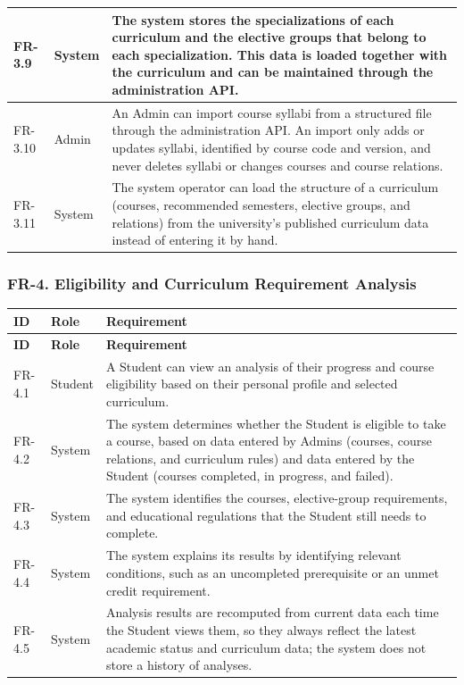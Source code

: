 \begin{longtable}{|p{}|p{}|p{}|}
\hline
FR-3.9 & System & The system stores the specializations of each curriculum and the elective groups that belong to each specialization. This data is loaded together with the curriculum and can be maintained through the administration API. \\
\hline
FR-3.10 & Admin & An Admin can import course syllabi from a structured file through the administration API. An import only adds or updates syllabi, identified by course code and version, and never deletes syllabi or changes courses and course relations. \\
\hline
FR-3.11 & System & The system operator can load the structure of a curriculum (courses, recommended semesters, elective groups, and relations) from the university's published curriculum data instead of entering it by hand. \\
\hline
\end{longtable}

\subsubsection{FR-4. Eligibility and Curriculum Requirement Analysis}
\begin{longtable}{|p{}|p{}|p{}|}
\hline
\textbf{ID} & \textbf{Role} & \textbf{Requirement} \\
\hline
\endfirsthead
\hline
\textbf{ID} & \textbf{Role} & \textbf{Requirement} \\
\hline
\endhead
FR-4.1 & Student & A Student can view an analysis of their progress and course eligibility based on their personal profile and selected curriculum. \\
\hline
FR-4.2 & System & The system determines whether the Student is eligible to take a course, based on data entered by Admins (courses, course relations, and curriculum rules) and data entered by the Student (courses completed, in progress, and failed). \\
\hline
FR-4.3 & System & The system identifies the courses, elective-group requirements, and educational regulations that the Student still needs to complete. \\
\hline
FR-4.4 & System & The system explains its results by identifying relevant conditions, such as an uncompleted prerequisite or an unmet credit requirement. \\
\hline
FR-4.5 & System & Analysis results are recomputed from current data each time the Student views them, so they always reflect the latest academic status and curriculum data; the system does not store a history of analyses. \\
\hline
\end{longtable}

